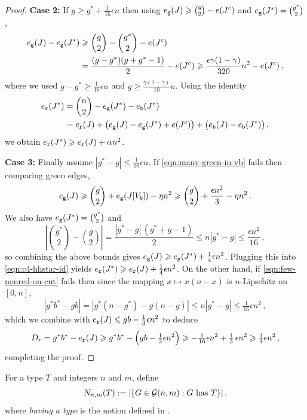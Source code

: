 \begin{proof}
\noindent\textbf{Case 2:} If $g\geq g^\ast+\tfrac{1}{16}\epsilon n$ then using $e_{\normalfont\texttt g}(J)\geqslant\binom{g}{2}-e(J^c)$ and $e_{\normalfont\texttt g}(J^\ast)=\binom{g^\ast}{2}$,
\begin{align*}
e_{\normalfont\texttt g}(J)-e_{\normalfont\texttt g}(J^\ast) &\geqslant \binom{g}{2}-\binom{g^\ast}{2}-e(J^c) \\
&= \frac{(g-g^\ast)(g+g^\ast-1)}{2}-e(J^c) \geqslant \frac{\epsilon\gamma(1-\gamma)}{320}n^2-e(J^c) \,,
\end{align*}
where we used $g-g^\ast\geq\tfrac{1}{16}\epsilon n$ and $g\geq\frac{\gamma(1-\gamma)}{10}n$. Using the identity
\begin{equation}\label{eqn:c4-hhstar-id}
\begin{aligned}
e_{\normalfont\texttt r}(J^\ast) &= \binom{n}{2} - e_{\normalfont\texttt g}(J^\ast) - e_{\normalfont\texttt b}(J^\ast) \\
&= e_{\normalfont\texttt r}(J) + \big(e_{\normalfont\texttt g}(J)- e_{\normalfont\texttt g}(J^\ast)+ e(J^c)\big) + \big(e_{\normalfont\texttt b}(J) - e_{\normalfont\texttt b}(J^\ast)\big) \,,
\end{aligned}
\end{equation}
we obtain $e_{\normalfont\texttt r}(J^\ast)\geqslant e_{\normalfont\texttt r}(J)+\alpha n^2$.

\noindent\textbf{Case 3:} Finally assume $|g^\ast-g|\leq\tfrac{1}{16}\epsilon n$. If \eqref{eqn:many-green-in-vb} fails then comparing green edges,
$$e_{\normalfont\texttt g}(J)\geqslant\binom{g}{2}+e_{\normalfont\texttt g}(J[V_{\normalfont\texttt b}])-\eta n^2\geqslant\binom{g}{2}+\frac{\epsilon n^2}{3}-\eta n^2\,.$$
We also have $e_{\normalfont\texttt g}(J^\ast)=\binom{g^\ast}{2}$ and
$$\left|\binom{g^\ast}{2}-\binom{g}{2}\right|=\frac{|g^\ast-g|\,(g^\ast+g-1)}{2}\leq n|g^\ast-g|\leq\frac{\epsilon n^2}{16}\,,$$
so combining the above bounds gives $e_{\normalfont\texttt g}(J)\geqslant e_{\normalfont\texttt g}(J^\ast)+{\textstyle\frac{1}{4}}\epsilon n^2$. Plugging this into \eqref{eqn:c4-hhstar-id} yields $e_{\normalfont\texttt r}(J^\ast)\geqslant e_{\normalfont\texttt r}(J)+{\textstyle\frac14}\epsilon n^2$. On the other hand, if \eqref{eqn:few-nonred-on-cut} fails then since the mapping $x\mapsto x(n-x)$ is $n$-Lipschitz on $[0,n]$,
$$|g^\ast b^\ast-gb|=|g^\ast(n-g^\ast)-g(n-g)| \leq n|g^\ast-g| \leq \tfrac{1}{16}\epsilon n^2\,,$$
which we combine with $e_{\normalfont\texttt r}(J)\leqslant gb-\frac13\epsilon n^2$ to deduce
$$D_r=g^\ast b^\ast-e_{{\normalfont\texttt r}}(J) \geqslant g^\ast b^\ast-\Big(gb-\tfrac13\epsilon n^2\Big) \geqslant -\tfrac{1}{16}\epsilon n^2+\tfrac13\,\epsilon n^2 \geqslant \tfrac14\epsilon n^2\,,$$
completing the proof.
\end{proof}

For a type $T$ and integers $n$ and $m$, define
$$N_{n,m}(T):=\lvert\{G\in{\mathcal G}(n,m):G\text{ has }T\}\rvert\,,$$
where \emph{having a type} is the notion defined in .

